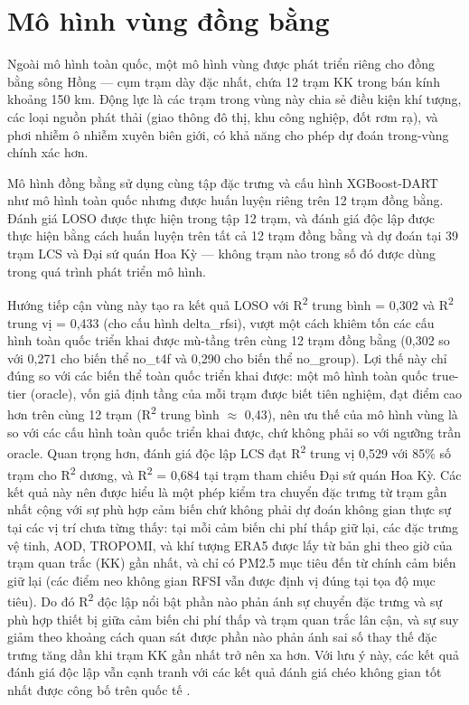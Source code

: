 \section{Mô hình vùng đồng bằng}

Ngoài mô hình toàn quốc, một mô hình vùng được phát triển riêng cho đồng bằng sông Hồng --- cụm trạm dày đặc nhất, chứa 12 trạm KK trong bán kính khoảng 150 km. Động lực là các trạm trong vùng này chia sẻ điều kiện khí tượng, các loại nguồn phát thải (giao thông đô thị, khu công nghiệp, đốt rơm rạ), và phơi nhiễm ô nhiễm xuyên biên giới, có khả năng cho phép dự đoán trong-vùng chính xác hơn.

Mô hình đồng bằng sử dụng cùng tập đặc trưng và cấu hình XGBoost-DART như mô hình toàn quốc nhưng được huấn luyện riêng trên 12 trạm đồng bằng. Đánh giá LOSO được thực hiện trong tập 12 trạm, và đánh giá độc lập được thực hiện bằng cách huấn luyện trên tất cả 12 trạm đồng bằng và dự đoán tại 39 trạm LCS và Đại sứ quán Hoa Kỳ --- không trạm nào trong số đó được dùng trong quá trình phát triển mô hình.

Hướng tiếp cận vùng này tạo ra kết quả LOSO với R\textsuperscript{2} trung bình = 0,302 và R\textsuperscript{2} trung vị = 0,433 (cho cấu hình delta\_rfsi), vượt một cách khiêm tốn các cấu hình toàn quốc triển khai được mù-tầng trên cùng 12 trạm đồng bằng (0,302 so với 0,271 cho biến thể no\_t4f và 0,290 cho biến thể no\_group). Lợi thế này chỉ đúng so với các biến thể toàn quốc triển khai được: một mô hình toàn quốc true-tier (oracle), vốn giả định tầng của mỗi trạm được biết tiên nghiệm, đạt điểm cao hơn trên cùng 12 trạm (R\textsuperscript{2} trung bình $\approx$ 0,43), nên ưu thế của mô hình vùng là so với các cấu hình toàn quốc triển khai được, chứ không phải so với ngưỡng trần oracle. Quan trọng hơn, đánh giá độc lập LCS đạt R\textsuperscript{2} trung vị 0,529 với 85\% số trạm cho R\textsuperscript{2} dương, và R\textsuperscript{2} = 0,684 tại trạm tham chiếu Đại sứ quán Hoa Kỳ. Các kết quả này nên được hiểu là một phép kiểm tra chuyển đặc trưng từ trạm gần nhất cộng với sự phù hợp cảm biến chứ không phải dự đoán không gian thực sự tại các vị trí chưa từng thấy: tại mỗi cảm biến chi phí thấp giữ lại, các đặc trưng vệ tinh, AOD, TROPOMI, và khí tượng ERA5 được lấy từ bản ghi theo giờ của trạm quan trắc (KK) gần nhất, và chỉ có PM2.5 mục tiêu đến từ chính cảm biến giữ lại (các điểm neo không gian RFSI vẫn được định vị đúng tại tọa độ mục tiêu). Do đó R\textsuperscript{2} độc lập nổi bật phần nào phản ánh sự chuyển đặc trưng và sự phù hợp thiết bị giữa cảm biến chi phí thấp và trạm quan trắc lân cận, và sự suy giảm theo khoảng cách quan sát được phần nào phản ánh sai số thay thế đặc trưng tăng dần khi trạm KK gần nhất trở nên xa hơn. Với lưu ý này, các kết quả đánh giá độc lập vẫn cạnh tranh với các kết quả đánh giá chéo không gian tốt nhất được công bố trên quốc tế \cite{kawano2025}.


